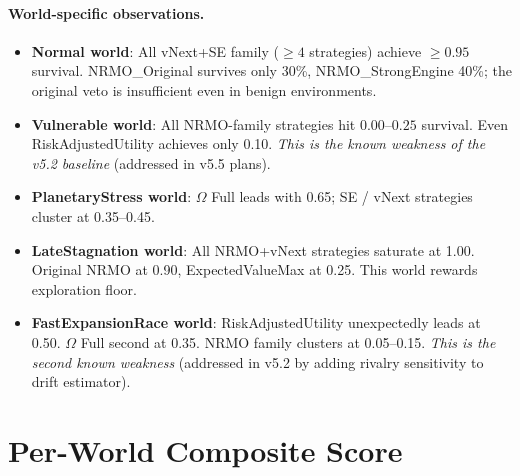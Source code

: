 \paragraph{World-specific observations.}

\begin{itemize}
\item \textbf{Normal world}: All vNext+SE family ($\ge 4$
strategies) achieve $\ge 0.95$ survival. NRMO\_Original survives
only 30\%, NRMO\_StrongEngine 40\%; the original veto is
insufficient even in benign environments.
\item \textbf{Vulnerable world}: All NRMO-family strategies hit
$0.00$--$0.25$ survival. Even RiskAdjustedUtility achieves only
0.10. \emph{This is the known weakness of the v5.2 baseline}
(addressed in v5.5 plans).
\item \textbf{PlanetaryStress world}: $\Omega$ Full leads with
0.65; SE / vNext strategies cluster at 0.35--0.45.
\item \textbf{LateStagnation world}: All NRMO+vNext strategies
saturate at 1.00. Original NRMO at 0.90, ExpectedValueMax at 0.25.
This world rewards exploration floor.
\item \textbf{FastExpansionRace world}: RiskAdjustedUtility
unexpectedly leads at 0.50. $\Omega$ Full second at 0.35. NRMO
family clusters at 0.05--0.15. \emph{This is the second known
weakness} (addressed in v5.2 by adding rivalry sensitivity to drift
estimator).
\end{itemize}

\section{Per-World Composite Score}
\label{sec:empirical-per-world-score}

